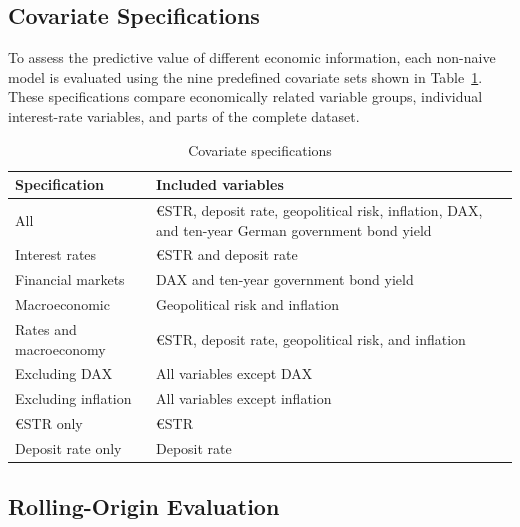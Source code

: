 \documentclass[11pt,a4paper]{article}
\begin{document}
\subsection{Covariate Specifications}
\label{subsec:covariates}

To assess the predictive value of different economic information, each
non-naive model is evaluated using the nine predefined covariate sets shown in
Table~\ref{tab:covariate_sets}. These specifications compare economically
related variable groups, individual interest-rate variables, and parts of
the complete dataset.

\begin{table}[htbp]
    \centering
    \caption{Covariate specifications}
    \label{tab:covariate_sets}
    \begin{tabularx}{\textwidth}{l X}
        \toprule
        Specification & Included variables \\
        \midrule
        All & €STR, deposit rate, geopolitical risk, inflation, DAX,
        and ten-year German government bond yield \\
        Interest rates & €STR and deposit rate \\
        Financial markets & DAX and ten-year government bond yield \\
        Macroeconomic & Geopolitical risk and inflation \\
        Rates and macroeconomy & €STR, deposit rate, geopolitical risk,
        and inflation \\
        Excluding DAX & All variables except DAX \\
        Excluding inflation & All variables except inflation \\
        €STR only & €STR \\
        Deposit rate only & Deposit rate \\
        \bottomrule
    \end{tabularx}
\end{table}


\subsection{Rolling-Origin Evaluation}
\label{subsec:rolling_evaluation}
\end{document}
